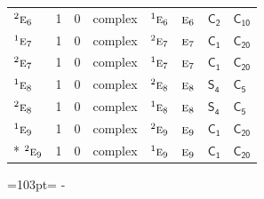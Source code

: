 \documentclass[10pt,a4paper]{article}
\newcommand{\needspace}[1]{\par\penalty-100\begingroup\dimen0=#1\relax\dimen2=\pagegoal
  \advance\dimen2-\pagetotal\ifdim\dimen0>\dimen2\relax\ifdim\dimen2>0pt\vfil\break\fi\fi
  \endgroup}
\numberwithin{equation}{section}
\newcommand{\grp}[1]{\mathsf{#1}}
\newcommand{\irr}[1]{\text{\normalfont\scshape #1}}
\newcommand{\conjpair}[1]{{}^{#1}}
\begin{document}
{\begin{longtable}{@{}lrrlllll@{}}
$\conjpair{2}\irr{e}_{6}$ & 1 & $0$ & complex & $\conjpair{1}\irr{e}_{6}$ & $\irr{e}_{6}$ & \href{C2.pdf}{$\grp{C_{2}}$} & \href{C10.pdf}{$\grp{C_{10}}$}\\
$\conjpair{1}\irr{e}_{7}$ & 1 & $0$ & complex & $\conjpair{2}\irr{e}_{7}$ & $\irr{e}_{7}$ & \href{C1.pdf}{$\grp{C_{1}}$} & $\grp{C_{20}}$\\
$\conjpair{2}\irr{e}_{7}$ & 1 & $0$ & complex & $\conjpair{1}\irr{e}_{7}$ & $\irr{e}_{7}$ & \href{C1.pdf}{$\grp{C_{1}}$} & $\grp{C_{20}}$\\
$\conjpair{1}\irr{e}_{8}$ & 1 & $0$ & complex & $\conjpair{2}\irr{e}_{8}$ & $\irr{e}_{8}$ & \href{S4.pdf}{$\grp{S_{4}}$} & \href{C5.pdf}{$\grp{C_{5}}$}\\
$\conjpair{2}\irr{e}_{8}$ & 1 & $0$ & complex & $\conjpair{1}\irr{e}_{8}$ & $\irr{e}_{8}$ & \href{S4.pdf}{$\grp{S_{4}}$} & \href{C5.pdf}{$\grp{C_{5}}$}\\
$\conjpair{1}\irr{e}_{9}$ & 1 & $0$ & complex & $\conjpair{2}\irr{e}_{9}$ & $\irr{e}_{9}$ & \href{C1.pdf}{$\grp{C_{1}}$} & $\grp{C_{20}}$\\*
$\conjpair{2}\irr{e}_{9}$ & 1 & $0$ & complex & $\conjpair{1}\irr{e}_{9}$ & $\irr{e}_{9}$ & \href{C1.pdf}{$\grp{C_{1}}$} & $\grp{C_{20}}$\\
\bottomrule\end{longtable}}
\needspace{103pt}
\end{document}
